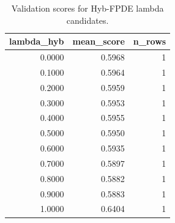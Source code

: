 \begin{table}[t]
\caption{Validation scores for Hyb-FPDE lambda candidates.}
\label{tab:lambda_distribution_computed}
\centering
\begin{tabular}{rrr}
\toprule
lambda\_hyb & mean\_score & n\_rows \\
\midrule
0.0000 & 0.5968 & 1 \\
0.1000 & 0.5964 & 1 \\
0.2000 & 0.5959 & 1 \\
0.3000 & 0.5953 & 1 \\
0.4000 & 0.5955 & 1 \\
0.5000 & 0.5950 & 1 \\
0.6000 & 0.5935 & 1 \\
0.7000 & 0.5897 & 1 \\
0.8000 & 0.5882 & 1 \\
0.9000 & 0.5883 & 1 \\
1.0000 & 0.6404 & 1 \\
\bottomrule
\end{tabular}

\end{table}

